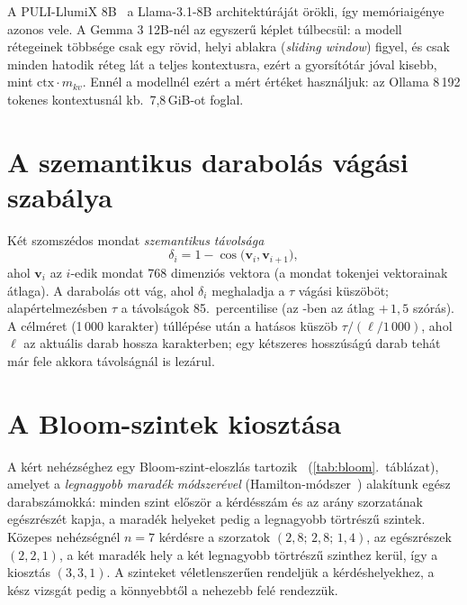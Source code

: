 A PULI-LlumiX 8B~\cite{pulillumix} a Llama-3.1-8B architektúráját örökli, így memóriaigénye azonos vele.
A Gemma 3 12B-nél az egyszerű képlet túlbecsül: a modell rétegeinek többsége csak egy rövid, helyi
ablakra (\emph{sliding window}) figyel, és csak minden hatodik réteg lát a teljes kontextusra, ezért a
gyorsítótár jóval kisebb, mint $\mathrm{ctx}\cdot m_{kv}$. Ennél a modellnél ezért a mért értéket
használjuk: az Ollama 8\,192 tokenes kontextusnál kb.\ 7,8\,GiB-ot foglal.

\section{A szemantikus darabolás vágási szabálya}
\label{app-darabolas}

Két szomszédos mondat \emph{szemantikus távolsága}
\begin{equation}
\delta_i = 1-\cos\bigl(\mathbf{v}_i,\mathbf{v}_{i+1}\bigr),
\label{eq:delta}
\end{equation}
ahol $\mathbf{v}_i$ az $i$-edik mondat 768 dimenziós vektora (a mondat tokenjei vektorainak átlaga). A
darabolás ott vág, ahol $\delta_i$ meghaladja a $\tau$ vágási küszöböt; alapértelmezésben $\tau$ a
távolságok 85.~percentilise (az -ben az átlag $+\,1{,}5$ szórás). A célméret (1\,000 karakter)
túllépése után a hatásos küszöb $\tau/(\ell/1\,000)$, ahol $\ell$ az aktuális darab hossza karakterben;
egy kétszeres hosszúságú darab tehát már fele akkora távolságnál is lezárul.

\section{A Bloom-szintek kiosztása}
\label{app-bloom}

A kért nehézséghez egy Bloom-szint-eloszlás tartozik~\cite{anderson2001bloom}
(\ref{tab:bloom}.~táblázat), amelyet a \emph{legnagyobb maradék módszerével}
(Hamilton-módszer~\cite{balinski2001fair}) alakítunk egész darabszámokká: minden szint először a
kérdésszám és az arány szorzatának egészrészét kapja, a maradék helyeket pedig a legnagyobb törtrészű
szintek. Közepes nehézségnél $n=7$ kérdésre a szorzatok $(2{,}8;\,2{,}8;\,1{,}4)$, az egészrészek
$(2,2,1)$, a két maradék hely a két legnagyobb törtrészű szinthez kerül, így a kiosztás $(3,3,1)$. A
szinteket véletlenszerűen rendeljük a kérdéshelyekhez, a kész vizsgát pedig a könnyebbtől a nehezebb
felé rendezzük.

